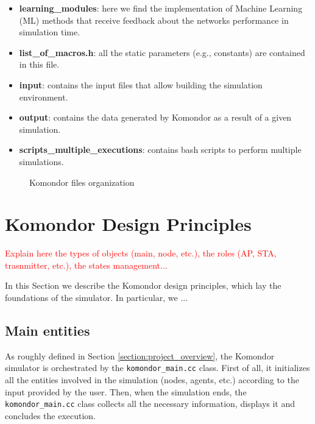 \documentclass[a4paper]{article}
\begin{document}
\begin{itemize}
	\item \textbf{learning\_modules}: here we find the implementation of Machine Learning (ML) methods that receive feedback about the networks performance in simulation time. 
	\item \textbf{list\_of\_macros.h}: all the static parameters (e.g., constants) are contained in this file.
	\item \textbf{input}: contains the input files that allow building the simulation environment.
	\item \textbf{output}: contains the data generated by Komondor as a result of a given simulation.	
	\item \textbf{scripts\_multiple\_executions}: contains bash scripts to perform multiple simulations.
\end{itemize} 

\begin{figure}[h!]
	\centering
	\caption{Komondor files organization}
	\label{fig:komondor_files}
\end{figure}	
	
\section{Komondor Design Principles}
\label{section:system_model}

\textcolor{red}{Explain here the types of objects (main, node, etc.), the roles (AP, STA, trasnmitter, etc.), the states management...}

In this Section we describe the Komondor design principles, which lay the foundations of the simulator. In particular, we ...

\subsection{Main entities}
\label{section:main_entities}
As roughly defined in Section \ref{section:project_overview}, the Komondor simulator is orchestrated by the \texttt{komondor\_main.cc} class. First of all, it initializes all the entities involved in the simulation (nodes, agents, etc.) according to the input provided by the user. Then, when the simulation ends, the \texttt{komondor\_main.cc} class collects all the necessary information, displays it and concludes the execution.
\end{document}

